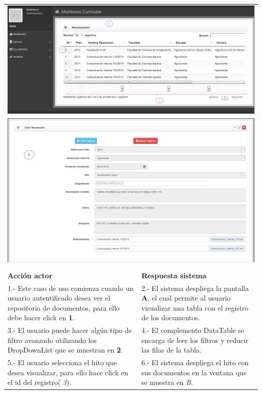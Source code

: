 \begin{longtable}{p{7cm}| p{7cm}}
		\multicolumn{2}{c}{\includegraphics[width=1\textwidth]{images/Capitulo_3/VerDocumentos2.png}} \\ 
		
		\multicolumn{2}{c}{\includegraphics[width=1\textwidth]{images/Capitulo_3/VerDocumentos3.png}} \\  \hline
		
		\rowcolor{LightBlue2}  \multicolumn{2}{c}{Curso normal de eventos} \\ 
		
		\textbf{Acción actor} &	\textbf{Respuesta sistema} \\ \hline
		
		1.- Este caso de uso comienza cuando un usuario autentificado desea ver el repositorio de documentos, para ello debe hacer click en \textbf{1}.
		&	2.- El sistema despliega la pantalla \textbf{A}, el cual permite al usuario visualizar una tabla con el registro de los documentos.\\ \hline
		
		
		3.- El usuario puede hacer algún tipo de filtro avanzado utilizando los DropDownList que se muestran en \textbf{2}.
		& 4.- El complemento DataTable se  encarga de leer los filtros y reducir las filas de la tabla.\\ \hline
		
		5.- El usuario selecciona el hito que desea visualizar, para ello hace click en el id del registro( \textit{3}).
		& 6.- El sistema despliega el hito  con sus documentos en  la ventana que se muestra en \textit{B}.\\ \hline

	
	\end{longtable}
	
